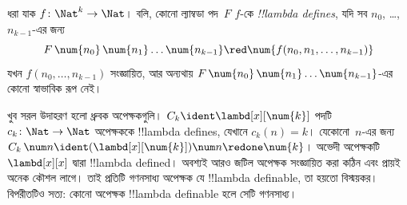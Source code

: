 \documentclass[../../../include/open-logic-section]{subfiles}
\begin{document}
\begin{defn}
ধরা যাক $f\colon \Nat^k \to \Nat$। বলি, কোনো ল্যাম্বডা পদ~$F$
$f$-কে \emph{!!{lambda define}s}, যদি সব
$n_0$, \dots,~$n_{k-1}$-এর জন্য
\[
F \, \num{n_0} \, \num{n_1} \dots \num{n_{k-1}} \red \num{f(n_0, n_1, \dots,
  n_{k-1})}
\]
যখন $f(n_0, \dots, n_{k-1})$ সংজ্ঞায়িত, আর অন্যথায়
$F \, \num{n_0} \, \num{n_1} \dots \num{n_{k-1}}$-এর কোনো স্বাভাবিক রূপ
নেই।
\end{defn}

খুব সরল উদাহরণ হলো ধ্রুবক অপেক্ষকগুলি। $C_k \ident
\lambd[x][\num{k}]$ পদটি $c_k\colon \Nat \to \Nat$ অপেক্ষককে
!!{lambda define}s, যেখানে $c_k(n) = k$।
যেকোনো~$n$-এর জন্য $C_k \, \num n \ident
(\lambd[x][\num{k}])\num n \redone \num{k}$। অভেদী অপেক্ষকটি
$\lambd[x][x]$ দ্বারা !!{lambda defined}। অবশ্যই আরও জটিল অপেক্ষক
সংজ্ঞায়িত করা কঠিন এবং প্রায়ই অনেক কৌশল লাগে। তাই প্রতিটি গণনসাধ্য
অপেক্ষক যে !!{lambda definable}, তা হয়তো বিস্ময়কর। বিপরীতটিও সত্য:
কোনো অপেক্ষক !!{lambda definable} হলে সেটি গণনসাধ্য।
\end{document}
